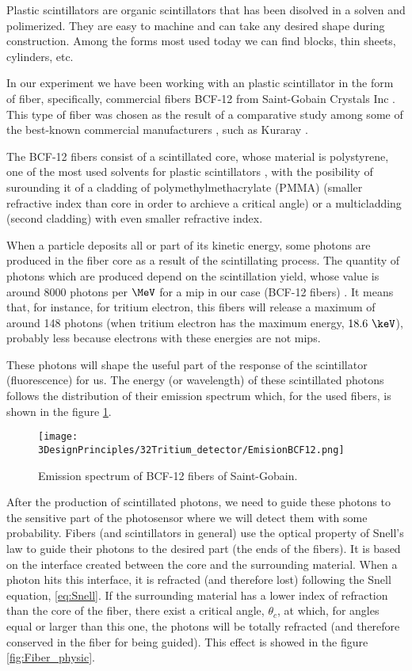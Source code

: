 Plastic scintillators are organic scintillators that has been disolved in a solven and polimerized. They are easy to machine and can take any desired shape during construction. Among the forms most used today we can find blocks, thin sheets, cylinders, etc.

In our experiment we have been working with an plastic scintillator in the form of fiber, specifically, commercial fibers BCF-12 from Saint-Gobain Crystals Inc \cite{DataSheetBCF12Fiber}. This type of fiber was chosen as the result of a comparative study among some of the best-known commercial manufacturers \cite{TFGAlberto}, such as Kuraray \cite{DataSheetKuraray}. 

The BCF-12 fibers consist of a scintillated core, whose material is polystyrene, one of the most used solvents for plastic scintillators \cite{Knoll}, with the posibility of surounding it of a cladding of polymethylmethacrylate (PMMA) (smaller refractive index than core in order to archieve a critical angle) or a multicladding (second cladding) with even smaller refractive index.

When a particle deposits all or part of its kinetic energy, some photons are produced in the fiber core as a result of the scintillating process. The quantity of photons which are produced depend on the scintillation yield, whose value is around $8000$ photons per $\MeV$ for a mip in our case (BCF-12 fibers) . It means that, for instance, for tritium electron, this fibers will release a maximum of around 148 photons (when tritium electron has the maximum energy, $18.6~\keV$), probably less because electrons with these energies are not mips.

These photons will shape the useful part of the response of the scintillator (fluorescence) for us. The energy (or wavelength) of these scintillated photons follows the distribution of their emission spectrum which, for the used fibers, is shown in the figure \ref{fig:EmissionSpectrumFibers}.

\begin{figure}[htbp]
\centering
\texttt{[image: 3DesignPrinciples/32Tritium\_detector/EmisionBCF12.png]}
\caption{Emission spectrum of BCF-12 fibers of Saint-Gobain.\label{fig:EmissionSpectrumFibers}~\cite{DataSheetBCF12Fiber}}
\end{figure}

After the production of scintillated photons, we need to guide these photons to the sensitive part of the photosensor where we will detect them with some probability. Fibers (and scintillators in general) use the optical property of Snell's law \cite{Snell} to guide their photons to the desired part (the ends of the fibers). It is based on the interface created between the core and the surrounding material. When a photon hits this interface, it is refracted (and therefore lost) following the Snell equation, \ref{eq:Snell}. If the surrounding material has a lower index of refraction than the core of the fiber, there exist a critical angle, $\theta_c$, at which, for angles equal or larger than this one, the photons will be totally refracted (and therefore conserved in the fiber for being guided). This effect is showed in the figure \ref{fig:Fiber_physic}.

